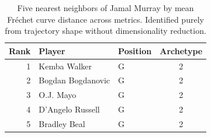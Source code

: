 \begin{table}[htbp]
  \centering\small
  \begin{tabular}{rllc}
    \toprule
    Rank & Player & Position & Archetype \\
    \midrule
    1 & Kemba Walker & G & 2 \\
    2 & Bogdan Bogdanovic & G & 2 \\
    3 & O.J. Mayo & G & 2 \\
    4 & D'Angelo Russell & G & 2 \\
    5 & Bradley Beal & G & 2 \\
    \bottomrule
  \end{tabular}
  \caption{Five nearest neighbors of Jamal Murray by mean Fr\'{e}chet curve distance across metrics. Identified purely from trajectory shape without dimensionality reduction.}
  \label{tab:Jamal_Murray_frechet_curve_neighbors}
\end{table}

